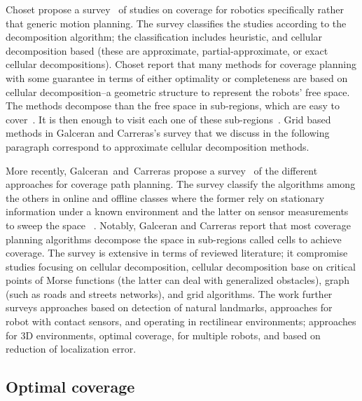 Choset propose a survey~\citep{choset2001coverage} of studies on coverage for robotics specifically rather that generic motion planning. The survey classifies the studies according to the decomposition algorithm; the classification includes heuristic, and cellular decomposition based (these are approximate, partial-approximate, or exact cellular decompositions). Choset report that many methods for coverage planning with some guarantee in terms of either optimality or completeness are based on cellular decomposition--a geometric structure to represent the robots' free space. The methods decompose than the free space in sub-regions, which are easy to cover~\citep{galceran2013survey}. It is then enough to visit each one of these sub-regions~\citep{galceran2013survey}. Grid based methods in Galceran and Carreras's survey that we discuss in the following paragraph correspond to approximate cellular decomposition methods. 

More recently, Galceran~and~Carreras propose a survey~\citep{galceran2013survey} of the different approaches for coverage path planning. The survey classify the algorithms among the others in online and offline classes where the former rely on stationary information under a known environment and the latter on sensor measurements to sweep the space~\citep{galceran2013survey} . Notably, Galceran and Carreras report that most coverage planning algorithms  decompose the space in sub-regions called cells to achieve coverage. The survey is extensive in terms of reviewed literature; it compromise studies focusing on cellular decomposition, cellular decomposition base on critical points of Morse functions (the latter can deal with generalized obstacles), graph (such as roads and streets networks), and grid algorithms. The work further surveys approaches based on detection of natural landmarks, approaches for robot with contact sensors, and operating in rectilinear environments; approaches for 3D environments, optimal coverage, for multiple robots, and based on reduction of localization error.

\subsection{Optimal coverage}
\label{sec:opti-cov}

